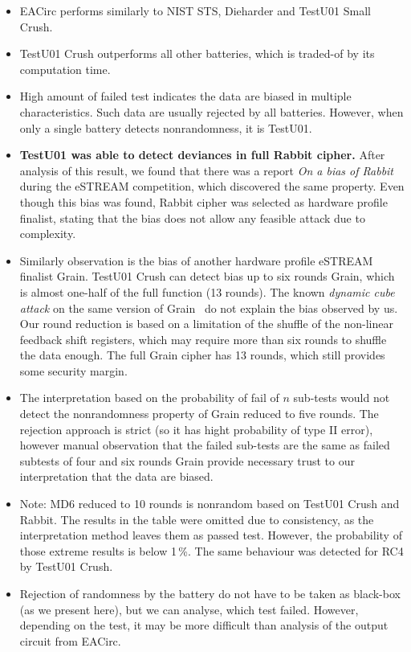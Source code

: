 \documentclass[
  print, %
  Table,   %
  nolof,     %
  nolot,     %
  11pt, %
  oneside  %
]{fithesis3}
\begin{document}
\begin{itemize}
    \item EACirc performs similarly to NIST STS, Dieharder and TestU01 Small Crush.
    \item TestU01 Crush outperforms all other batteries, which is traded-of by its computation time.
    \item High amount of failed test indicates the data are biased in multiple characteristics. Such data are usually rejected by all batteries. However, when only a single battery detects nonrandomness, it is TestU01.
    \item \textbf{TestU01 was able to detect deviances in full Rabbit cipher.} After analysis of this result, we found that there was a report \textit{On a bias of Rabbit}~\cite{aumasson2007bias} during the eSTREAM competition, which discovered the same property. Even though this bias was found, Rabbit cipher was selected as hardware profile finalist, stating that the bias does not allow any feasible attack due to complexity.
    \item Similarly observation is the bias of another hardware profile eSTREAM finalist Grain. TestU01 Crush can detect bias up to six rounds Grain, which is almost one-half of the full function (13 rounds). The known \textit{dynamic cube attack} on the same version of Grain~\cite{dinur2011breaking} do not explain the bias observed by us. Our round reduction is based on a limitation of the shuffle of the non-linear feedback shift registers, which may require more than six rounds to shuffle the data enough. The full Grain cipher has 13 rounds, which still provides some security margin.
    \item The interpretation based on the probability of fail of $n$ sub-tests would not detect the nonrandomness property of Grain reduced to five rounds. The rejection approach is strict (so it has hight probability of type II error), however manual observation that the failed sub-tests are the same as failed subtests of four and six rounds Grain provide necessary trust to our interpretation that the data are biased.
    \item Note: MD6 reduced to 10 rounds is nonrandom based on TestU01 Crush and Rabbit. The results in the table were omitted due to consistency, as the interpretation method leaves them as passed test. However, the probability of those extreme results is below 1\,\%. The same behaviour was detected for RC4 by TestU01 Crush.
    \item Rejection of randomness by the battery do not have to be taken as black-box (as we present here), but we can analyse, which test failed. However, depending on the test, it may be more difficult than analysis of the output circuit from EACirc.


\end{itemize}
\end{document}
